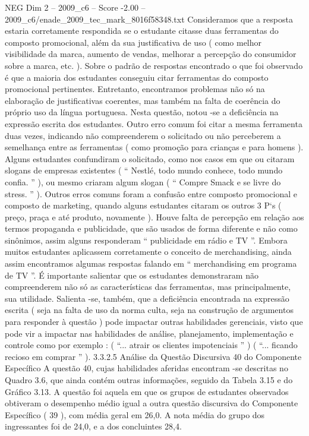 \begin{textsample}{NEG Dim 2 – 2009\_c6 – Score -2.00 – 2009\_c6/enade\_2009\_tec\_mark\_8016f58348.txt}
Consideramos que a resposta estaria corretamente respondida se o estudante citasse duas ferramentas do composto promocional, além da sua justificativa de uso ( como melhor visibilidade da marca, aumento de vendas, melhorar a percepção do consumidor sobre a marca, etc. ).
Sobre o padrão de respostas encontrado o que foi observado é que a maioria dos estudantes conseguiu citar ferramentas do composto promocional pertinentes.
Entretanto, encontramos problemas não só na elaboração de justificativas coerentes, mas também na falta de coerência do próprio uso da língua portuguesa.
Nesta questão, notou -se a deficiência na expressão escrita dos estudantes.
Outro erro comum foi citar a mesma ferramenta duas vezes, indicando não compreenderem o solicitado ou não perceberem a semelhança entre as ferramentas ( como promoção para crianças e para homens ).
Alguns estudantes confundiram o solicitado, como nos casos em que ou citaram slogans de empresas existentes ( “ Nestlé, todo mundo conhece, todo mundo confia. ” ), ou mesmo criaram algum slogan ( “ Compre Smack e se livre do stress. ” ).
Outros erros comuns foram a confusão entre composto promocional e composto de marketing, quando alguns estudantes citaram os outros 3 P`s ( preço, praça e até produto, novamente ).
Houve falta de percepção em relação aos termos propaganda e publicidade, que são usados de forma diferente e não como sinônimos, assim alguns responderam “ publicidade em rádio e TV ”.
Embora muitos estudantes aplicassem corretamente o conceito de merchandising, ainda assim encontramos algumas respostas falando em “ merchandising em programa de TV ”.
É importante salientar que os estudantes demonstraram não compreenderem não só as características das ferramentas, mas principalmente, sua utilidade.
Salienta -se, também, que a deficiência encontrada na expressão escrita ( seja na falta de uso da norma culta, seja na construção de argumentos para responder à questão ) pode impactar outras habilidades gerenciais, visto que pode vir a impactar nas habilidades de análise, planejamento, implementação e controle como por exemplo : ( “... atrair os clientes impotenciais ” ) ( “... ficando recioso em comprar ” ). 3.3.2.5 Análise da Questão Discursiva 40 do Componente Específico A questão 40, cujas habilidades aferidas encontram -se descritas no Quadro 3.6, que ainda contém outras informações, seguido da Tabela 3.15 e do Gráfico 3.13.
A questão foi aquela em que os grupos de estudantes observados obtiveram o desempenho médio igual a outra questão discursiva do Componente Específico ( 39 ), com média geral em 26,0.
A nota média do grupo dos ingressantes foi de 24,0, e a dos concluintes 28,4.

\end{textsample}

